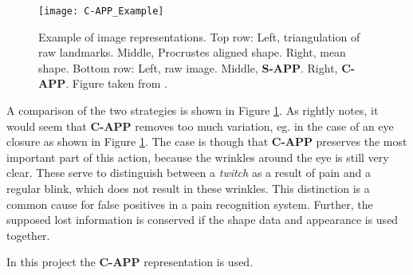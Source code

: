 \documentclass[Main]{subfiles}
\begin{document}
			\begin{figure}[H]
				\begin{center}
					\texttt{[image: C-APP\_Example]}
				\end{center}
				\caption{
					Example of image representations.
					Top row: Left, triangulation of raw landmarks. Middle, Procrustes aligned shape. Right, mean shape.
					Bottom row: Left, raw image. Middle, \textbf{S-APP}. Right, \textbf{C-APP}.
					Figure taken from \cite{Ashraf2009}.
					}
				\label{fig:app_strategies}
			\end{figure}

			A comparison of the two strategies is shown in Figure \ref{fig:app_strategies}.
			As \cite{Ashraf2009} rightly notes, it would seem that \textbf{C-APP} removes too much variation, eg. in the case of an eye closure as shown in Figure \ref{fig:app_strategies}.
			The case is though that \textbf{C-APP} preserves the most important part of this action, because the wrinkles around the eye is still very clear.
			These serve to distinguish between a \emph{twitch} as a result of pain and a regular blink, which does not result in these wrinkles.
			This distinction is a common cause for false positives in a pain recognition system.
			Further, the supposed lost information is conserved if the shape data and appearance is used together.

			In this project the \textbf{C-APP} representation is used.
\end{document}
